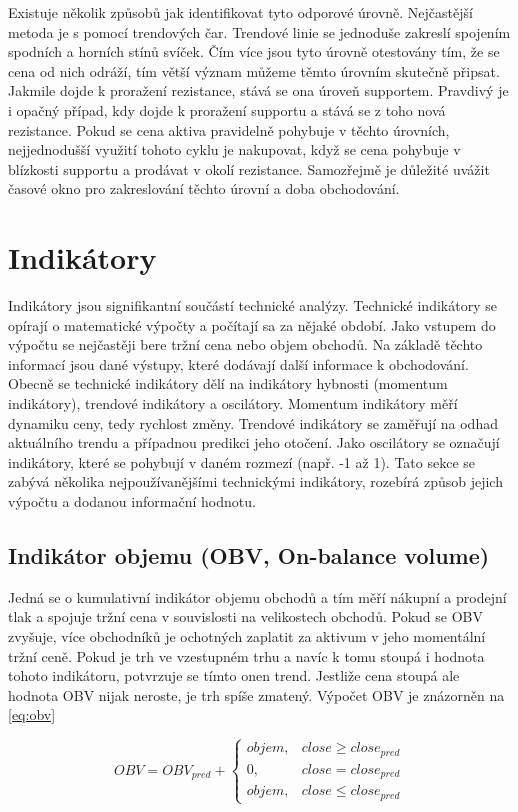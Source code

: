 Existuje několik způsobů jak identifikovat tyto odporové úrovně. Nejčastější metoda je s pomocí trendových čar. Trendové linie se jednoduše zakreslí spojením spodních a horních stínů svíček.
Čím více jsou tyto úrovně otestovány tím, že se cena od nich odráží, tím větší význam můžeme těmto úrovním skutečně připsat. Jakmile dojde k proražení rezistance, stává se ona úroveň
supportem. Pravdivý je i opačný případ, kdy dojde k proražení supportu a stává se z toho nová rezistance.
Pokud se cena aktiva pravidelně pohybuje v těchto úrovních, nejjednodušší využití tohoto cyklu je nakupovat, když se cena pohybuje v blízkosti supportu a prodávat v okolí rezistance.
Samozřejmě je důležité uvážit časové okno pro zakreslování těchto úrovní a doba obchodování.

\section{Indikátory}
\label{sec:Indicators}
Indikátory jsou signifikantní součástí technické analýzy. Technické indikátory se opírají o matematické výpočty a počítají sa za nějaké období. Jako vstupem do výpočtu se nejčastěji
bere tržní cena nebo objem obchodů. Na základě těchto informací jsou dané výstupy, které dodávají další informace k obchodování.
Obecně se technické indikátory dělí na indikátory hybnosti (momentum indikátory), trendové indikátory a oscilátory. Momentum indikátory měří dynamiku ceny, tedy rychlost změny.
Trendové indikátory se zaměřují na odhad aktuálního trendu a případnou predikci jeho otočení. Jako oscilátory se označují indikátory, které se pohybují v daném rozmezí (např. -1 až 1).
Tato sekce se zabývá několika nejpoužívanějšími technickými indikátory, rozebírá způsob jejich výpočtu a dodanou informační hodnotu.

\subsection{Indikátor objemu (OBV, On-balance volume)}
Jedná se o kumulativní indikátor objemu obchodů a tím měří nákupní a prodejní tlak a spojuje tržní cena v souvislosti na velikostech obchodů. Pokud se OBV zvyšuje, více obchodníků
je ochotných zaplatit za aktivum v jeho momentální tržní ceně. Pokud je trh ve vzestupném trhu a navíc k tomu stoupá i hodnota tohoto indikátoru, potvrzuje se tímto onen trend.
Jestliže cena stoupá ale hodnota OBV nijak neroste, je trh spíše zmatený. Výpočet OBV je znázorněn na \ref{eq:obv}

\begin{equation}
    OBV = OBV_{pred} +
    \begin{cases}
        objem, & close \ge close_{pred} \\
        0,     & close = close_{pred}   \\
        objem, & close \le close_{pred}
    \end{cases}
    \label{eq:obv}
\end{equation}

